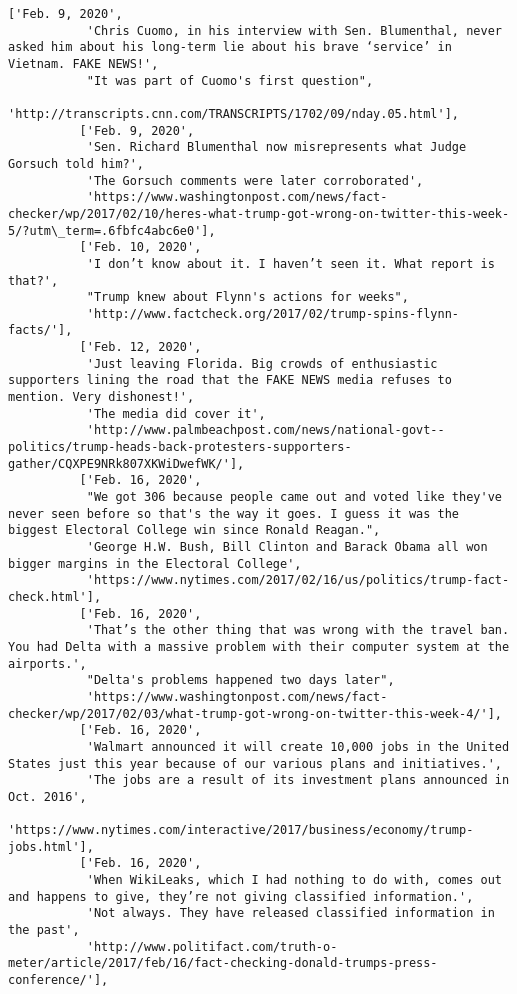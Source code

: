\documentclass[11pt]{article}
\begin{document}
\begin{Verbatim}[commandchars=\\\{\}]
          ['Feb. 9, 2020',
           'Chris Cuomo, in his interview with Sen. Blumenthal, never asked him about his long-term lie about his brave ‘service’ in Vietnam. FAKE NEWS!',
           "It was part of Cuomo's first question",
           'http://transcripts.cnn.com/TRANSCRIPTS/1702/09/nday.05.html'],
          ['Feb. 9, 2020',
           'Sen. Richard Blumenthal now misrepresents what Judge Gorsuch told him?',
           'The Gorsuch comments were later corroborated',
           'https://www.washingtonpost.com/news/fact-checker/wp/2017/02/10/heres-what-trump-got-wrong-on-twitter-this-week-5/?utm\_term=.6fbfc4abc6e0'],
          ['Feb. 10, 2020',
           'I don’t know about it. I haven’t seen it. What report is that?',
           "Trump knew about Flynn's actions for weeks",
           'http://www.factcheck.org/2017/02/trump-spins-flynn-facts/'],
          ['Feb. 12, 2020',
           'Just leaving Florida. Big crowds of enthusiastic supporters lining the road that the FAKE NEWS media refuses to mention. Very dishonest!',
           'The media did cover it',
           'http://www.palmbeachpost.com/news/national-govt--politics/trump-heads-back-protesters-supporters-gather/CQXPE9NRk807XKWiDwefWK/'],
          ['Feb. 16, 2020',
           "We got 306 because people came out and voted like they've never seen before so that's the way it goes. I guess it was the biggest Electoral College win since Ronald Reagan.",
           'George H.W. Bush, Bill Clinton and Barack Obama all won bigger margins in the Electoral College',
           'https://www.nytimes.com/2017/02/16/us/politics/trump-fact-check.html'],
          ['Feb. 16, 2020',
           'That’s the other thing that was wrong with the travel ban. You had Delta with a massive problem with their computer system at the airports.',
           "Delta's problems happened two days later",
           'https://www.washingtonpost.com/news/fact-checker/wp/2017/02/03/what-trump-got-wrong-on-twitter-this-week-4/'],
          ['Feb. 16, 2020',
           'Walmart announced it will create 10,000 jobs in the United States just this year because of our various plans and initiatives.',
           'The jobs are a result of its investment plans announced in Oct. 2016',
           'https://www.nytimes.com/interactive/2017/business/economy/trump-jobs.html'],
          ['Feb. 16, 2020',
           'When WikiLeaks, which I had nothing to do with, comes out and happens to give, they’re not giving classified information.',
           'Not always. They have released classified information in the past',
           'http://www.politifact.com/truth-o-meter/article/2017/feb/16/fact-checking-donald-trumps-press-conference/'],

\end{Verbatim}
\end{document}
